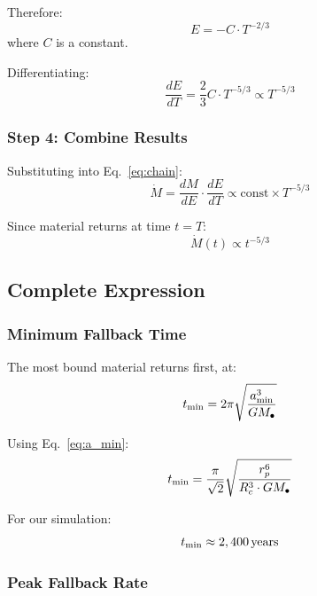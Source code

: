 \documentclass[twocolumn,amsmath,amssymb,prd,superscriptaddress,nofootinbib]{revtex4-2}
\begin{document}
Therefore:
\begin{equation}
    E = -C \cdot T^{-2/3}
\end{equation}
where $C$ is a constant.

Differentiating:
\begin{equation}
    \frac{dE}{dT} = \frac{2}{3}C \cdot T^{-5/3} \propto T^{-5/3}
    \label{eq:dE_dT}
\end{equation}

\subsubsection{Step 4: Combine Results}

Substituting into Eq.~\eqref{eq:chain}:
\begin{equation}
    \dot{M} = \frac{dM}{dE} \cdot \frac{dE}{dT} \propto \text{const} \times T^{-5/3}
\end{equation}

Since material returns at time $t = T$:
\begin{equation}
    \boxed{\dot{M}(t) \propto t^{-5/3}}
    \label{eq:t53}
\end{equation}

\subsection{Complete Expression}
\label{sec:fallback_complete}

\subsubsection{Minimum Fallback Time}

The most bound material returns first, at:
\begin{equation}
    t_{\rm min} = 2\pi\sqrt{\frac{a_{\rm min}^3}{GM_\bullet}}
\end{equation}

Using Eq.~\eqref{eq:a_min}:
\begin{equation}
    t_{\rm min} = \frac{\pi}{\sqrt{2}}\sqrt{\frac{r_p^6}{R_c^3 \cdot GM_\bullet}}
    \label{eq:t_min}
\end{equation}

For our simulation:
\begin{equation}
    t_{\rm min} \approx 2,400\,{\rm years}
\end{equation}

\subsubsection{Peak Fallback Rate}
\end{document}
